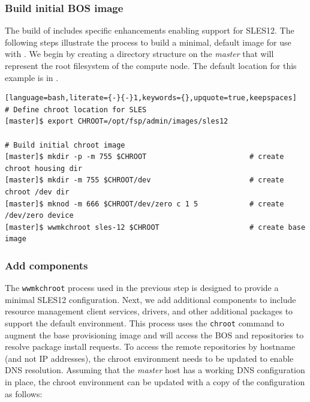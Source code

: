 \documentclass[letterpaper]{article}
\newcommand{\baseOS}{SLES12}
\begin{document}
\subsubsection{Build initial BOS image} \label{sec:assemble_bos}

The \FSP{} build of \Warewulf{} includes specific enhancements enabling support for
\baseOS{}. The following steps illustrate the process to build a minimal, default
image for use with \Warewulf{}.  We begin by creating a directory structure on the 
{\em master} that will represent the root filesystem of the compute node. The 
default location for this example is in .

\begin{lstlisting}[language=bash,literate={-}{-}1,keywords={},upquote=true,keepspaces]
# Define chroot location for SLES 
[master]$ export CHROOT=/opt/fsp/admin/images/sles12

# Build initial chroot image
[master]$ mkdir -p -m 755 $CHROOT                        # create chroot housing dir
[master]$ mkdir -m 755 $CHROOT/dev                       # create chroot /dev dir
[master]$ mknod -m 666 $CHROOT/dev/zero c 1 5            # create /dev/zero device
[master]$ wwmkchroot sles-12 $CHROOT                     # create base image
\end{lstlisting}

\subsubsection{Add \FSP{} components} \label{sec:add_components}

The \texttt{wwmkchroot} process used in the previous step is designed to
provide a minimal \baseOS{} configuration. Next, we add additional components to
include resource management client services, \InfiniBand{} drivers, and other
additional packages to support the default \FSP{} environment.  This process uses
the \texttt{chroot} command to augment the base provisioning image and will
access the BOS and \FSP{} repositories to resolve package install requests. To
access the remote repositories by hostname (and not IP addresses), the chroot
environment needs to be updated to enable DNS resolution. Assuming that
the {\em master} host has a working DNS configuration in place, the chroot environment can
be updated with a copy of the configuration as follows:
\end{document}
